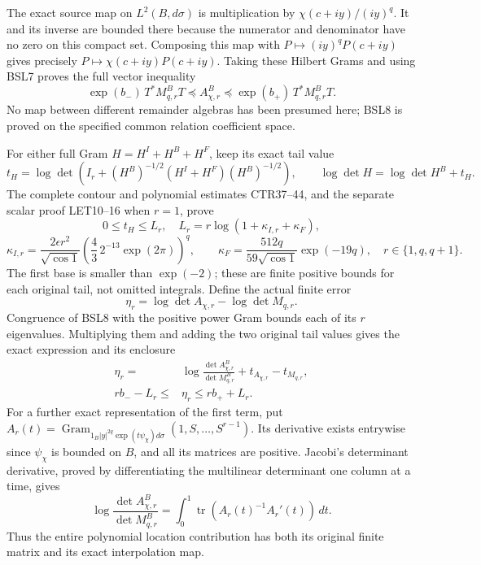 \documentclass[11pt,a4paper]{article}
\begin{document}
The exact source map on $L^2(B,d\sigma)$ is multiplication by
$\chi(c+iy)/(iy)^q$. It and its inverse are bounded there because
the numerator and denominator have no zero on this compact set.
Composing this map with $P\mapsto(iy)^qP(c+iy)$ gives precisely
$P\mapsto\chi(c+iy)P(c+iy)$. Taking these Hilbert Grams and using
BSL7 proves the full vector inequality
\[
 \exp(b_-)\,T^*M_{q,r}^BT
 \preceq A_{\chi,r}^B
 \preceq\exp(b_+)\,T^*M_{q,r}^BT.
 \tag{BSL8}
\]
No map between different remainder algebras has been presumed here;
BSL8 is proved on the specified common relation coefficient space.

For either full Gram $H=H^I+H^B+H^F$, keep its exact tail value
\[
 t_H=\log\det\left(I_r+(H^B)^{-1/2}
                       (H^I+H^F)(H^B)^{-1/2}\right),\qquad
 \log\det H=\log\det H^B+t_H.
\]
The complete contour and polynomial estimates CTR37--44, and the
separate scalar proof LET10--16 when $r=1$, prove
\[
 0\leq t_H\leq L_r,
 \quad L_r=r\log(1+\kappa_{I,r}+\kappa_F),
\]
\[
 \kappa_{I,r}=\frac{2\epsilon r^2}{\sqrt{\cos1}}
       \left(\frac43\,2^{-13}\exp(2\pi)\right)^q,
 \qquad \kappa_F=\frac{512q}{59\sqrt{\cos1}}\exp(-19q),
 \quad r\in\{1,q,q+1\}.
 \tag{BSL9}
\]
The first base is smaller than $\exp(-2)$; these are finite
positive bounds for each original tail, not omitted integrals.
Define the actual finite error
\[
 \eta_r=\log\det A_{\chi,r}-\log\det M_{q,r}.
\]
Congruence of BSL8 with the positive power Gram bounds each of its
$r$ eigenvalues. Multiplying them and adding the two original tail
values gives the exact expression and its enclosure
\[
 \begin{split}
 \eta_r={}&\log\frac{\det A_{\chi,r}^B}{\det M_{q,r}^B}
                 +t_{A_{\chi,r}}-t_{M_{q,r}},\\
 rb_- -L_r\leq{}&\eta_r\leq rb_++L_r.
 \end{split}
 \tag{BSL10}
\]
For a further exact representation of the first term, put
$A_r(t)=\operatorname{Gram}_{1_B|y|^{2q}\exp(t\psi_\chi)d\sigma}
(1,S,\ldots,S^{r-1})$. Its derivative exists entrywise since
$\psi_\chi$ is bounded on $B$, and all its matrices are positive.
Jacobi's determinant derivative, proved by differentiating the
multilinear determinant one column at a time, gives
\[
 \log\frac{\det A_{\chi,r}^B}{\det M_{q,r}^B}
    =\int_0^1\operatorname{tr}(A_r(t)^{-1}A_r'(t))\,dt.
 \tag{BSL11}
\]
Thus the entire polynomial location contribution has both its original
finite matrix and its exact interpolation map.
\end{document}
